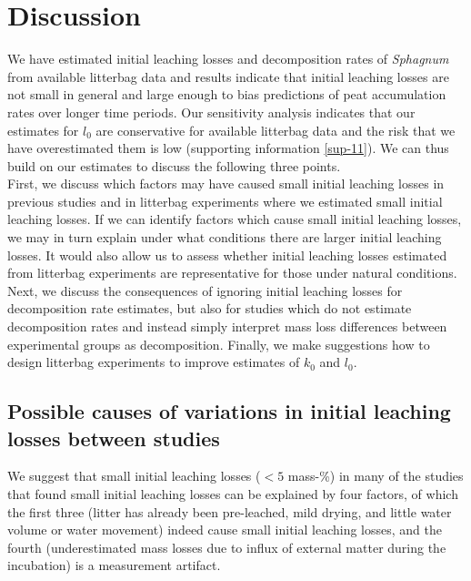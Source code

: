 \documentclass[bg, manuscript]{copernicus}
\begin{document}
\section{Discussion}

We have estimated initial leaching losses and decomposition rates of \emph{Sphagnum} from available litterbag data and results indicate that initial leaching losses are not small in general and large enough to bias predictions of peat accumulation rates over longer time periods. Our sensitivity analysis indicates that our estimates for \(l_0\) are conservative for available litterbag data and the risk that we have overestimated them is low (supporting information \ref{sup-11}). We can thus build on our estimates to discuss the following three points.\\
First, we discuss which factors may have caused small initial leaching losses in previous studies and in litterbag experiments where we estimated small initial leaching losses. If we can identify factors which cause small initial leaching losses, we may in turn explain under what conditions there are larger initial leaching losses. It would also allow us to assess whether initial leaching losses estimated from litterbag experiments are representative for those under natural conditions. Next, we discuss the consequences of ignoring initial leaching losses for decomposition rate estimates, but also for studies which do not estimate decomposition rates and instead simply interpret mass loss differences between experimental groups as decomposition. Finally, we make suggestions how to design litterbag experiments to improve estimates of \(k_0\) and \(l_0\).

\hypertarget{out-discussion-2}{%
\subsection{Possible causes of variations in initial leaching losses between studies}\label{out-discussion-2}}

We suggest that small initial leaching losses (\(<5\) mass-\%) in many of the studies that found small initial leaching losses can be explained by four factors, of which the first three (litter has already been pre-leached, mild drying, and little water volume or water movement) indeed cause small initial leaching losses, and the fourth (underestimated mass losses due to influx of external matter during the incubation) is a measurement artifact.
\end{document}
